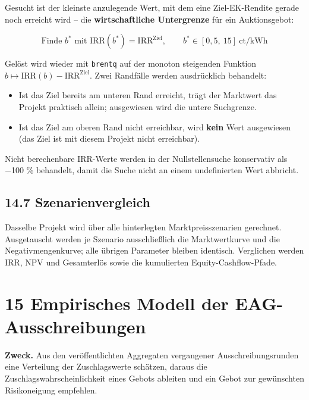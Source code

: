 \documentclass[
  a4paper,
  10pt]{article}
\providecommand{\tightlist}{%
  \setlength{\itemsep}{0pt}\setlength{\parskip}{0pt}}
\begin{document}
Gesucht ist der kleinste anzulegende Wert, mit dem eine Ziel-EK-Rendite
gerade noch erreicht wird -- die \textbf{wirtschaftliche Untergrenze}
für ein Auktionsgebot:

\[ \text{Finde } b^{*} \text{ mit } \mathrm{IRR}\left(b^{*}\right) = \mathrm{IRR}^{\mathrm{Ziel}}, \qquad b^{*} \in [0{,}5,\ 15]\ \text{ct/kWh} \]

Gelöst wird wieder mit \texttt{brentq} auf der monoton steigenden
Funktion \(b \mapsto \mathrm{IRR}(b) - \mathrm{IRR}^{\mathrm{Ziel}}\).
Zwei Randfälle werden ausdrücklich behandelt:

\begin{itemize}
\tightlist
\item
  Ist das Ziel bereits am unteren Rand erreicht, trägt der Marktwert das
  Projekt praktisch allein; ausgewiesen wird die untere Suchgrenze.
\item
  Ist das Ziel am oberen Rand nicht erreichbar, wird \textbf{kein} Wert
  ausgewiesen (das Ziel ist mit diesem Projekt nicht erreichbar).
\end{itemize}

Nicht berechenbare IRR-Werte werden in der Nullstellensuche konservativ
als −100 \% behandelt, damit die Suche nicht an einem undefinierten Wert
abbricht.

\hypertarget{szenarienvergleich}{%
\subsection{14.7 Szenarienvergleich}\label{szenarienvergleich}}

Dasselbe Projekt wird über alle hinterlegten Marktpreisszenarien
gerechnet. Ausgetauscht werden je Szenario ausschließlich die
Marktwertkurve und die Negativmengenkurve; alle übrigen Parameter
bleiben identisch. Verglichen werden IRR, NPV und Gesamterlös sowie die
kumulierten Equity-Cashflow-Pfade.

\hypertarget{empirisches-modell-der-eag-ausschreibungen}{%
\section{15 Empirisches Modell der
EAG-Ausschreibungen}\label{empirisches-modell-der-eag-ausschreibungen}}

\textbf{Zweck.} Aus den veröffentlichten Aggregaten vergangener
Ausschreibungsrunden eine Verteilung der Zuschlagswerte schätzen, daraus
die Zuschlagswahrscheinlichkeit eines Gebots ableiten und ein Gebot zur
gewünschten Risikoneigung empfehlen.
\end{document}
